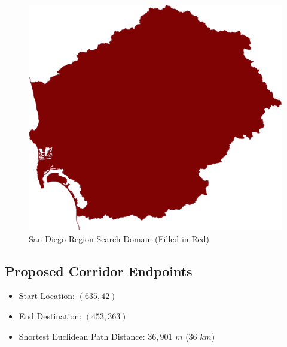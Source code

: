         \begin{figure}[!h]
            \begin{center}
            \includegraphics[width=5.5in]{figures/SanDiego_SearchDomain.png}   
            \caption{San Diego Region Search Domain (Filled in Red)}
            \label{fig:SDdomain}
            \end{center}
        \end{figure}

    \subsection{Proposed Corridor Endpoints}
    
    \begin{itemize}
      \setlength{\itemsep}{0cm}
      \setlength{\parskip}{0cm}
        \item Start Location: $(635,42)$
        \item End Destination: $(453,363)$    
        \item Shortest Euclidean Path Distance: $36,901$ $m$ ($36$ $km$)
    \end{itemize}
    
